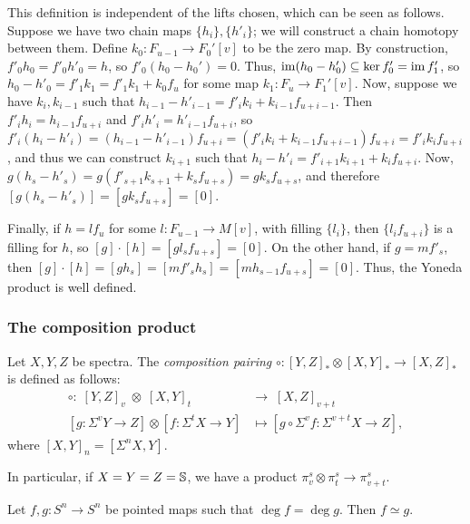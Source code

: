 \documentclass{MetricNotes2023}
\def\bb{\ensuremath\mathbb}
\def\subq{\ensuremath\subseteq}
\DeclareMathOperator{\im}{im}
\begin{document}
This definition is independent of the lifts chosen, which can be seen as follows. Suppose we have two chain maps \(\{h_i\}, \{h'_i\}\); we will construct a chain homotopy between them. Define \(k_0 : F_{u-1}\to F_0'[v]\) to be the zero map. By construction, \(f'_0h_0=f'_0h'_0=h\), so \(f'_0(h_0-h_0')=0\). Thus, \(\im(h_0-h'_0)\subq \ker f'_0=\im f'_1\), so \(h_0-h'_0=f'_1k_1=f'_1k_1+k_0f_{u}\) for some map \(k_1 : F_u \to F_1'[v]\). Now, suppose we have \(k_i, k_{i-1}\) such that \(h_{i-1}-h'_{i-1} = f'_{i}k_i+k_{i-1}f_{u+i-1}\). Then \(f'_ih_i=h_{i-1}f_{u+i}\) and \(f'_ih'_i=h'_{i-1}f_{u+i}\), so \(f'_i(h_i-h'_i)=(h_{i-1}-h'_{i-1})f_{u+i}=(f'_{i}k_i+k_{i-1}f_{u+i-1})f_{u+i}=f'_ik_if_{u+i}\), and thus we can construct \(k_{i+1}\) such that \(h_i-h'_i=f'_{i+1}k_{i+1}+k_if_{u+i}\). Now, \(g(h_s-h'_s)=g(f'_{s+1}k_{s+1}+k_sf_{u+s})=gk_sf_{u+s}\), and therefore \([g(h_s-h'_s)]=[gk_sf_{u+s}]=[0]\).

Finally, if \(h=lf_u\) for some \(l : F_{u-1}\to M[v]\), with filling \(\{l_i\}\), then \(\{l_if_{u+i}\}\) is a filling for \(h\), so \([g]\cdot [h]=[gl_sf_{u+s}]=[0]\). On the other hand, if \(g=mf'_{s}\), then \([g]\cdot[h]=[gh_s]=[mf'_sh_s]=[mh_{s-1}f_{u+s}]=[0]\). Thus, the Yoneda product is well defined.

\subsubsection{The composition product}

\begin{definition}
Let \(X, Y, Z\) be spectra. The \textit{composition pairing} \(\circ : [Y, Z]_* \otimes [X,Y]_* \to [X,Z]_*\) is defined as follows: 
\begin{align*}
\circ :\; [Y, Z]_v\; \otimes \;[X,Y]_t\; &\to\; [X,Z]_{v+t}\\
[g : \Sigma^v Y \to Z]\otimes [f : \Sigma^t X\to Y] &\mapsto [g \circ \Sigma^v f : \Sigma^{v+t}X\to Z],
\end{align*}
where \([X,Y]_n=[\Sigma^n X, Y]\).
\end{definition}

In particular, if \(X=Y=Z=\bb{S}\), we have a product \(\pi_v^s\otimes \pi_t^s\to \pi_{v+t}^s\).

\begin{lemma}\label{2504281107}
Let \(f, g : S^n \to S^n\) be pointed maps such that \(\deg f = \deg g\). Then \(f \simeq g\). 
\end{lemma}
\end{document}
